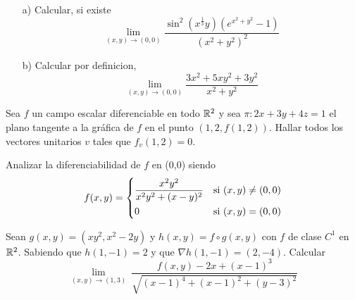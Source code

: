 
\begin{question}

\vspace{1em} %

\begin{itemize}
    \item[a)] Calcular, si existe
    \[
        \lim_{(x,y)\to(0,0)} \frac{\sin^2{(x^{\frac{1}{3}}y)}(e^{x^2+y^2}-1)}{(x^2+y^2)^2}
    \]
     \item[b)] Calcular por definicion,
     \[
        \lim_{(x,y)\to(0,0)} \frac{3x^2+5xy^2+3y^2}{x^2+y^2}
    \]
\end{itemize}



\end{question}

\begin{question}
    Sea $f$ un campo escalar diferenciable en todo $\mathbb{R}^2$ y sea $\pi:2x+3y+4z=1$ el plano tangente a la gráfica de $f$ en el punto $(1,2,f(1,2))$. Hallar todos los vectores unitarios $v$ tales que $f_v(1,2)=0.$
\end{question}
\begin{question}
    Analizar la diferenciabilidad de $f$ en (0,0) siendo
      \[
        f(x,y) =
        \begin{dcases}
            \frac{x^2y^2}{x^2y^2+(x-y)^2} & \textnormal{si}\ (x,y) \neq (0,0) \\
            0                         & \textnormal{si}\ (x,y) = (0,0)
        \end{dcases}
    \]
\end{question}
\begin{question}
    Sean $g(x,y)=(xy^2,x^2-2y)$ y $h(x,y)=f \circ g(x,y)$ con $f$ de clase $C^1$ en $\mathbb{R}^2$. Sabiendo que $h(1,-1)=2$ y que $\nabla h(1,-1)=(2,-4)$. Calcular
    \[
        \lim_{(x,y)\to (1,3)} \ 
        \frac{f(x,y)-2x+(x-1)^3}{\sqrt{(x-1)^4+(x-1)^2+(y-3)^2}}       
    \]
\end{question}
\newpage


